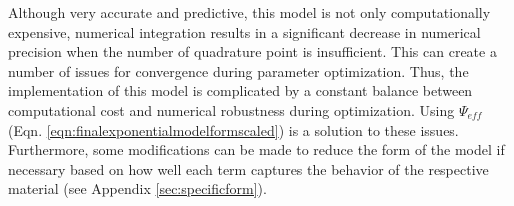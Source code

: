 	Although very accurate and predictive, this model is not only computationally expensive, numerical integration results in a significant decrease in numerical precision when the number of quadrature point is insufficient. This can create a number of issues for convergence during parameter optimization. Thus, the implementation of this model is complicated by a constant balance between computational cost and numerical robustness during optimization. Using $\Psi_{eff}$ (Eqn. \ref{eqn:finalexponentialmodelformscaled}) is a solution to these issues. Furthermore, some modifications can be made to reduce the form of the model if necessary based on how well each term captures the behavior of the respective material (see Appendix \ref{sec:specificform}).
    
    
    



	









